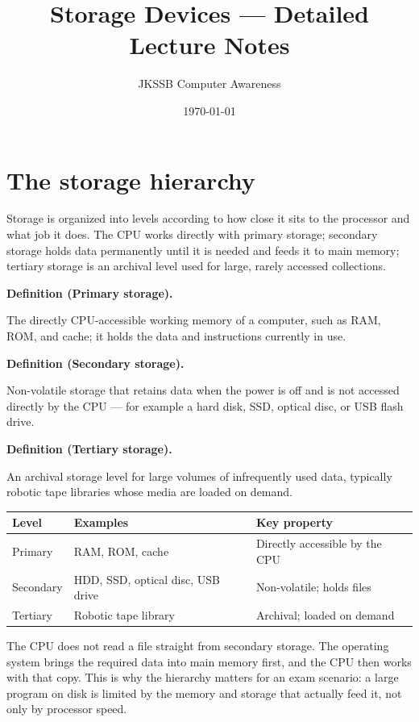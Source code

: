 \documentclass[11pt]{article}
\title{Storage Devices --- Detailed Lecture Notes}
\author{JKSSB Computer Awareness}
\date{\today}
\newenvironment{definitionbox}[1]{%
  \par\noindent\textbf{Definition (#1).}\ \itshape
}{\par\vspace{0.3em}}
\begin{document}
\maketitle

\section{The storage hierarchy}
Storage is organized into levels according to how close it sits to the
processor and what job it does. The CPU works directly with primary storage;
secondary storage holds data permanently until it is needed and feeds it to
main memory; tertiary storage is an archival level used for large, rarely
accessed collections.

\begin{definitionbox}{Primary storage}
The directly CPU-accessible working memory of a computer, such as RAM, ROM,
and cache; it holds the data and instructions currently in use.
\end{definitionbox}

\begin{definitionbox}{Secondary storage}
Non-volatile storage that retains data when the power is off and is not
accessed directly by the CPU --- for example a hard disk, SSD, optical disc,
or USB flash drive.
\end{definitionbox}

\begin{definitionbox}{Tertiary storage}
An archival storage level for large volumes of infrequently used data,
typically robotic tape libraries whose media are loaded on demand.
\end{definitionbox}

\begin{center}
\begin{tabular}{p{}p{}p{}}
\toprule
\textbf{Level} & \textbf{Examples} & \textbf{Key property}\\
\midrule
Primary & RAM, ROM, cache & Directly accessible by the CPU\\
Secondary & HDD, SSD, optical disc, USB drive & Non-volatile; holds files\\
Tertiary & Robotic tape library & Archival; loaded on demand\\
\bottomrule
\end{tabular}
\end{center}

The CPU does not read a file straight from secondary storage. The operating
system brings the required data into main memory first, and the CPU then works
with that copy. This is why the hierarchy matters for an exam scenario: a
large program on disk is limited by the memory and storage that actually feed
it, not only by processor speed.
\end{document}
